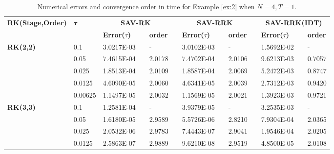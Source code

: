 \documentclass[preprint,compress,3p,10pt,fleqn]{elsarticle}
\numberwithin{equation}{section}
\begin{document}
\begin{table}[H]\footnotesize
\centering
\caption{Numerical errors and convergence order in time for Example \ref{ex:2} when $N=4, T = 1$.}
\begin{tabular}{lllllrlrlrlrlrl}
\toprule
\multicolumn{2}{l}{\multirow{2}[3]{*}{\textbf{RK(Stage,Order)}}} & \multicolumn{2}{l}{\multirow{2}[3]{*}{$\bm{\tau}$}} & \multicolumn{3}{c}{\textbf{SAV-RK}} &       & \multicolumn{3}{c}{\textbf{SAV-RRK}} &       & \multicolumn{3}{c}{\textbf{SAV-RRK(IDT)}} \\
\cmidrule{5-7}\cmidrule{9-11}\cmidrule{13-15}    \multicolumn{2}{l}{} & \multicolumn{2}{l}{} & \textbf{Error($\tau$)} &       & \textbf{order} &       & \textbf{Error($\tau$)} &       & \textbf{order} &       & \textbf{Error($\tau$)} &       & \textbf{order} \\
\hline
\multicolumn{2}{l}{\multirow{5}[0]{*}{\textbf{RK(2,2)}}} & \multicolumn{2}{l}{0.1} & 3.0217E-03 &       & -     &       & 3.0102E-03 &       & -     &       & 1.5692E-02 &       & - \\
\multicolumn{2}{l}{} & \multicolumn{2}{l}{0.05} & 7.4615E-04 &       & 2.0178  &       & 7.4702E-04 &       & 2.0106  &       & 9.6213E-03 &       & 0.7057  \\
\multicolumn{2}{l}{} & \multicolumn{2}{l}{0.025} & 1.8513E-04 &       & 2.0109  &       & 1.8587E-04 &       & 2.0069  &       & 5.2472E-03 &       & 0.8747  \\
\multicolumn{2}{l}{} & \multicolumn{2}{l}{0.0125} & 4.6090E-05 &       & 2.0060  &       & 4.6341E-05 &       & 2.0039  &       & 2.7312E-03 &       & 0.9420  \\
\multicolumn{2}{l}{} & \multicolumn{2}{l}{0.00625} & 1.1497E-05 &       & 2.0032  &       & 1.1569E-05 &       & 2.0021  &       & 1.3923E-03 &       & 0.9721  \\
\multicolumn{2}{l}{\multirow{5}[0]{*}{\textbf{RK(3,3)}}} & \multicolumn{2}{l}{0.1} & 1.2581E-04 &       & -     &       & 3.9379E-05 &       & -     &       & 3.2535E-03 &       & - \\
\multicolumn{2}{l}{} & \multicolumn{2}{l}{0.05} & 1.6180E-05 &       & 2.9589  &       & 5.5726E-06 &       & 2.8210  &       & 7.9304E-04 &       & 2.0365  \\
\multicolumn{2}{l}{} & \multicolumn{2}{l}{0.025} & 2.0532E-06 &       & 2.9783  &       & 7.4443E-07 &       & 2.9041  &       & 1.9546E-04 &       & 2.0205  \\
\multicolumn{2}{l}{} & \multicolumn{2}{l}{0.0125} & 2.5863E-07 &       & 2.9889  &       & 9.6210E-08 &       & 2.9519  &       & 4.8500E-05 &       & 2.0108  \\

\end{tabular}
\end{table}
\end{document}
